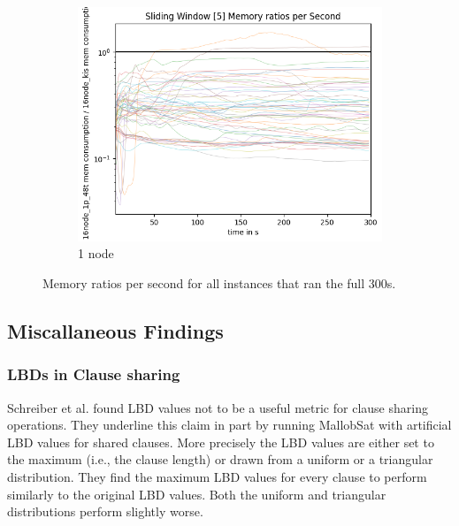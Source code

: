\documentclass[12pt,a4paper,twoside]{scrartcl}
\numberwithin{equation}{section}
\begin{document}
\begin{figure}
\begin{subfigure}[c]{.4\textwidth}
    \includegraphics[scale=.3]{plots/16node_compare/mem_ratio_per_second.png}
    \caption{1 node}
  \end{subfigure}
  \caption{Memory ratios per second for all instances that ran the full 300s.}
  \label{fig:memRatiosSecs}
\end{figure}




\subsection{Miscallaneous Findings}

\subsubsection{LBDs in Clause sharing}

Schreiber et al. \cite{searchOnlyPaper} found LBD values not to be a useful metric for clause sharing operations. They underline this claim in part by running MallobSat with artificial LBD values for shared clauses. More precisely the LBD values are either set to the maximum (i.e., the clause length) or drawn from a uniform or a triangular distribution. They find the maximum LBD values for every clause to perform similarly to the original LBD values. Both the uniform and triangular distributions perform slightly worse.
\end{document}
